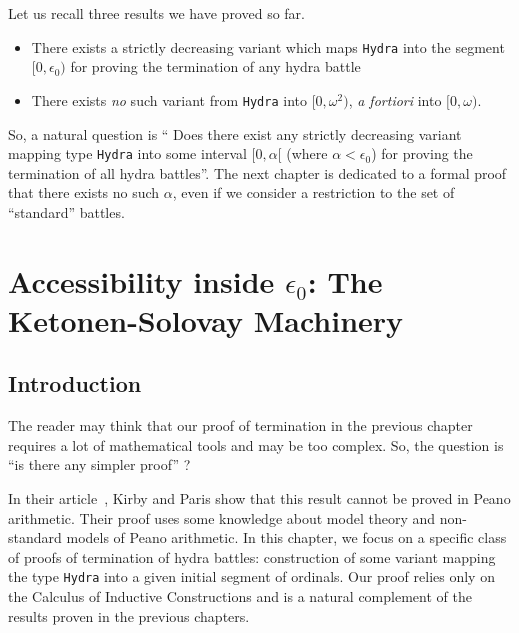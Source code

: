     Let us recall three results we have proved so far.
    \begin{itemize}
    \item There exists a strictly decreasing variant which maps \texttt{Hydra} into 
    the segment $[0,\epsilon_0)$ for proving the termination of any hydra battle
    \item There exists \emph{no} such variant from \texttt{Hydra} into 
    $[0,\omega^2)$, \emph{a fortiori} into $[0,\omega)$.
    \end{itemize}

    So, a  natural question is `` Does there exist any strictly decreasing variant mapping
    type \texttt{Hydra} into some interval $[0,\alpha[$ (where $\alpha <\epsilon_0$) for proving the termination of all hydra battles''. The next chapter is dedicated to a formal proof that there exists no such $\alpha$, even if we consider a restriction to the set of ``standard'' battles.













\chapter[The Ketonen-Solovay machinery]{Accessibility inside \texorpdfstring{$\epsilon_0$}{Epsilon0}: The Ketonen-Solovay Machinery\label{ks-chapter}}
\label{chap:ketonen}

\section{Introduction}
The reader may think that our proof of termination in the previous  chapter requires a lot of mathematical tools and may be too  complex. So, the question is ``is there  any  simpler proof'' ?

In their article~\cite{KP82}, Kirby and Paris show that this result cannot be proved in Peano arithmetic. Their proof uses some knowledge about model theory and non-standard models of Peano arithmetic. In this chapter, we focus on a specific class of proofs of termination of hydra battles: construction of some variant mapping the type \texttt{Hydra} into a given initial  segment of ordinals. Our proof relies only on the Calculus of Inductive Constructions and is a natural complement of the results proven in the previous chapters.

